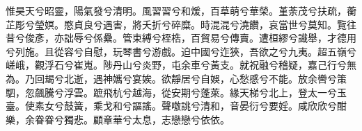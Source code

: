 
\begin{pinyinscope}
惟昊天兮昭靈，陽氣發兮清明。風習習兮和煖，百草萌兮華榮。堇荼茂兮扶疏，蘅芷彫兮瑩嫇。愍貞良兮遇害，將夭折兮碎糜。時混混兮澆饡，哀當世兮莫知。覽往昔兮俊彥，亦詘辱兮係纍。管束縛兮桎梏，百貿易兮傳賣。遭桓繆兮識舉，才德用兮列施。且從容兮自慰，玩琴書兮游戲。迫中國兮迮狹，吾欲之兮九夷。超五嶺兮嵯峨，觀浮石兮崔嵬。陟丹山兮炎野，屯余車兮黃支。就祝融兮稽疑，嘉己行兮無為。乃回朅兮北逝，遇神孈兮宴娭。欲靜居兮自娛，心愁慼兮不能。放余轡兮策駟，忽飆騰兮浮雲。蹠飛杭兮越海，從安期兮蓬萊。緣天梯兮北上，登太一兮玉臺。使素女兮鼓簧，乘戈和兮謳謠。聲噭誂兮清和，音晏衍兮要婬。咸欣欣兮酣樂，余眷眷兮獨悲。顧章華兮太息，志戀戀兮依依。


\end{pinyinscope}